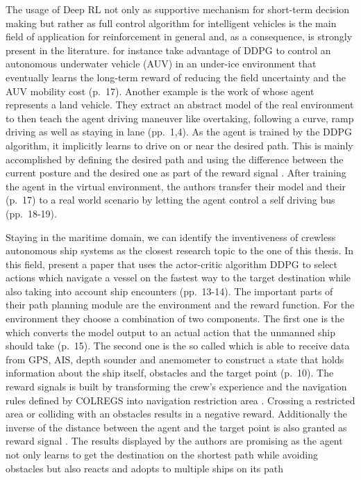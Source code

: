 \par
The usage of Deep RL not only as supportive mechanism for short-term decision making but rather as full control algorithm for intelligent vehicles is the main field of application for reinforcement in general and, 
as a consequence, is strongly present in the literature. \cite{wang2018reinforcement} for instance take advantage of DDPG to control an autonomous underwater vehicle (AUV) in an under-ice environment that eventually learns the long-term reward of reducing the field uncertainty and the AUV mobility cost (p.~17). Another example is the work of \cite{s18092905} whose agent represents a land vehicle. They extract an abstract model of the real environment to then teach the agent driving maneuver like overtaking, following a curve, ramp driving as well as staying in lane (pp.~1,4). As the agent is trained by the DDPG algorithm, it implicitly learns to drive on or near the desired path. This is mainly accomplished by defining the desired path and using the difference between the current posture and the desired one as part of the reward signal \cite[p.~4]{s18092905}. After training the agent in the virtual environment, the authors transfer their model and their  (p.~17) to a real world scenario by letting the agent control a self driving bus (pp.~18-19).
\par
Staying in the maritime domain, we can identify the inventiveness of crewless autonomous ship systems as the closest research topic to the one of this thesis. In this field, \cite{s20020426} present a paper that uses the actor-critic algorithm DDPG to select actions which navigate a vessel on the fastest way to the target destination while also taking into account ship encounters (pp.~13-14). The important parts of their path planning module are the environment and the reward function. For the environment they choose a combination of two components. The first one is the  which converts the model output to an actual action that the unmanned ship should take (p.~15). The second one is the so called  which is able to receive data from GPS, AIS, depth sounder and anemometer to construct a state that holds information about the ship itself, obstacles and the target point (p.~10). The reward signals is built by transforming the crew's experience and the navigation rules defined by COLREGS \cite[]{COLREG} into navigation restriction area \cite[p.~14]{s20020426}. Crossing a restricted area or colliding with an obstacles results in a negative reward. Additionally the inverse of the distance between the agent and the target point is also granted as reward signal \cite[p.~14]{s20020426}. The results displayed by the authors are promising as the agent not only learns to get the destination on the shortest path while avoiding obstacles but also reacts and adopts to multiple ships on its path
